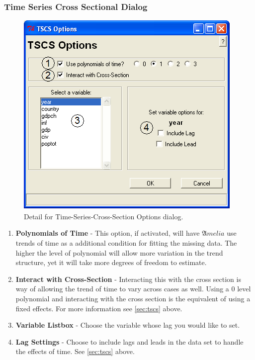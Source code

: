 \documentclass[12pt,titlepage]{article}
\begin{document}
\subsubsection{Time Series Cross Sectional Dialog}
\label{sec:tscsdiag}
\begin{figure}[ht]
  \centering \includegraphics[scale=.75]{tscs.png}
  \caption{Detail for Time-Series-Cross-Section Options dialog.}
\end{figure}
\begin{enumerate}
\item \textbf{Polynomials of Time} - This option, if activated, will
  have ${\mathfrak Amelia}$ use trends of time as a additional
  condition for fitting the missing data.  The higher the level of
  polynomial will allow more variation in the trend structure, yet it
  will take more degrees of freedom to estimate.
\item \textbf{Interact with Cross-Section} - Interacting this with the
  cross section is way of allowing the trend of time to vary across
  cases as well.  Using a 0 level polynomial and interacting with the
  cross section is the equivalent of using a fixed effects.  For more
  information see \ref{sec:tscs} above.
\item \textbf{Variable Listbox} - Choose the variable whose lag you
  would like to set.
\item \textbf{Lag Settings} - Choose to include lags and leads in the
  data set to handle the effects of time.  See \ref{sec:tscs} above.
\end{enumerate}
\end{document}
